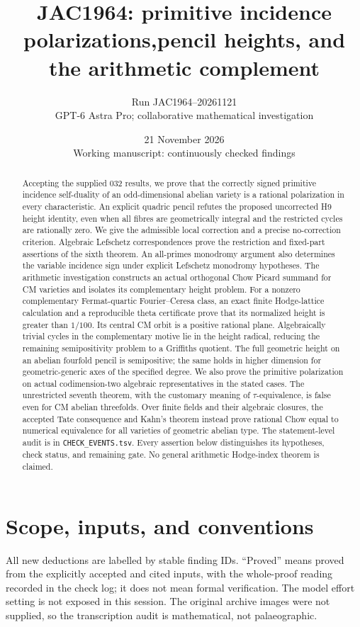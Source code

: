 \documentclass[11pt,a4paper]{article}
\title{JAC1964: primitive incidence polarizations,\newline pencil heights, and the arithmetic complement}
\author{Run JAC1964--20261121\\GPT-6 Astra Pro; collaborative mathematical investigation}
\date{21 November 2026\\Working manuscript: continuously checked findings}
\begin{document}
\maketitle
\begin{abstract}
Accepting the supplied 032 results, we prove that the correctly signed
primitive incidence self-duality of an odd-dimensional abelian variety is
a rational polarization in every characteristic. An explicit quadric
pencil refutes the proposed uncorrected H9 height identity, even when
all fibres are geometrically integral and the restricted cycles are
rationally zero. We give the admissible local correction and a precise
no-correction criterion. Algebraic Lefschetz correspondences prove the
restriction and fixed-part assertions of the sixth theorem. An
all-primes monodromy argument also determines the variable incidence
sign under explicit Lefschetz monodromy hypotheses. The arithmetic
investigation constructs an actual orthogonal Chow Picard summand for
CM varieties and isolates its complementary height problem. For a
nonzero complementary Fermat-quartic Fourier--Ceresa class, an exact
finite Hodge-lattice calculation and a reproducible theta certificate
prove that its normalized height is greater than $1/100$.
Its central CM orbit is a positive rational plane. Algebraically
trivial cycles in the complementary motive lie in the height radical,
reducing the remaining semipositivity problem to a Griffiths quotient.
The full geometric height on an abelian fourfold pencil is semipositive;
the same holds in higher dimension for geometric-generic axes of the
specified degree. We also prove the primitive polarization on actual
codimension-two algebraic representatives in the stated cases.
The unrestricted seventh theorem, with the customary meaning of
$\tau$-equivalence, is false even for CM abelian threefolds.
Over finite fields and their algebraic closures, the accepted Tate
consequence and Kahn's theorem instead prove rational Chow equal to
numerical equivalence for all varieties of geometric abelian type.
The statement-level audit is in \texttt{CHECK\_EVENTS.tsv}.
Every assertion below distinguishes its hypotheses, check status, and
remaining gate. No general arithmetic Hodge-index theorem is claimed.
\end{abstract}
\tableofcontents
\newpage
\section{Scope, inputs, and conventions}
All new deductions are labelled by stable finding IDs. ``Proved'' means
proved from the explicitly accepted and cited inputs, with the
whole-proof reading recorded in the check log; it does not mean formal
verification. The model effort setting is not exposed in this session.
The original archive images were not supplied, so the transcription
audit is mathematical, not palaeographic.
\end{document}
